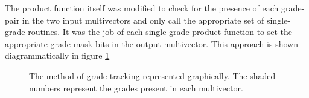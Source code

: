 The product function itself was modified to check for the presence of each 
grade-pair in the two input multivectors and only call the appropriate 
set of single-grade routines. It was the job of each single-grade
product function to set the appropriate grade mask bits in the output multivector.
This approach is shown diagrammatically in figure \ref{fig:parallel}

\begin{figure}
\centering
{}
\caption{The method of grade tracking represented graphically. The shaded
numbers represent the grades present in each multivector.\label{fig:parallel}}
\end{figure}

% 
% 
% 
% 
% 
% 
% 
